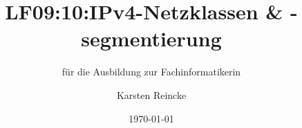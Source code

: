 \documentclass[]{beamer}
\title{LF09:10:IPv4-Netzklassen \& -segmentierung}
\subtitle{für die Ausbildung zur Fachinformatikerin}
\institute{GS-LDK}
\author{Karsten Reincke}
\date{\today}
\def\cfgGl{../../../cfg.gl/}
\begin{document}

\begin{frame}
  \titlepage
\end{frame}






\logo{}
\newpage



%
\end{document}

